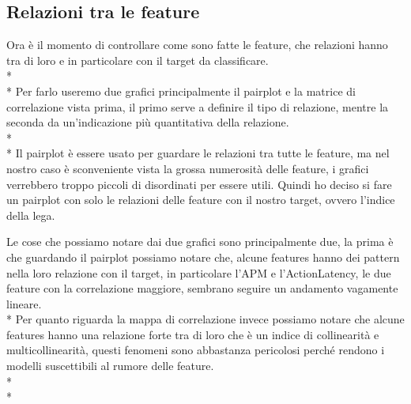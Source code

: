 \subsection{Relazioni tra le feature}\label{ssec:relazioni}
\normalsize
\par
Ora è il momento di controllare come sono fatte le feature, che relazioni hanno tra di loro e in particolare con il target da classificare.\\*\\*
Per farlo useremo due grafici principalmente il pairplot e la matrice di correlazione vista prima, il primo serve a definire il tipo di relazione, mentre la seconda da un’indicazione più quantitativa della relazione. \\*\\*
Il pairplot è essere usato per guardare le relazioni tra tutte le feature, ma nel nostro caso è sconveniente vista la grossa numerosità delle feature, i grafici verrebbero troppo piccoli di disordinati per essere utili. Quindi ho deciso si fare un pairplot con solo le relazioni delle feature con il nostro target, ovvero l’indice della lega.
\begin{figure}[htp]
\end{figure}
\par
Le cose che possiamo notare dai due grafici sono principalmente due, la prima è che guardando il pairplot possiamo notare che, alcune features hanno dei pattern nella loro relazione con il target, in particolare l'APM e l'ActionLatency, le due feature con la correlazione maggiore, sembrano seguire un andamento vagamente lineare.\\*
 Per quanto riguarda la mappa di correlazione invece possiamo notare che alcune features hanno una relazione forte tra di loro che è un indice di collinearità e multicollinearità, questi fenomeni sono abbastanza pericolosi perché rendono i modelli suscettibili al rumore delle feature. \\*\\*
